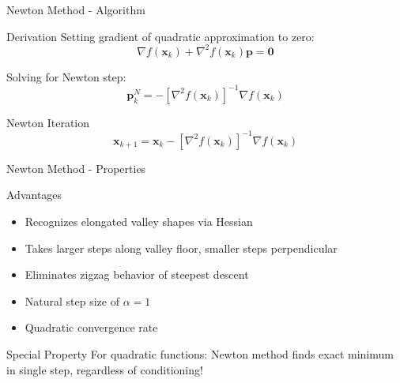 \documentclass[aspectratio=1610]{beamer}
\begin{document}
\begin{frame}{Newton Method - Algorithm}
  \begin{block}{Derivation}
    Setting gradient of quadratic approximation to zero:
    $$\nabla f(\mathbf{x}_k) + \nabla^2 f(\mathbf{x}_k)\mathbf{p} = \mathbf{0}$$
    
    Solving for Newton step:
    $$\mathbf{p}_k^N = -[\nabla^2 f(\mathbf{x}_k)]^{-1}\nabla f(\mathbf{x}_k)$$
  \end{block}
  
  \vspace{0.5cm}
  \begin{block}{Newton Iteration}
    $$\mathbf{x}_{k+1} = \mathbf{x}_k - [\nabla^2 f(\mathbf{x}_k)]^{-1}\nabla f(\mathbf{x}_k)$$
  \end{block}
\end{frame}

\begin{frame}{Newton Method - Properties}
  \begin{block}{Advantages}
    \begin{itemize}
      \item Recognizes elongated valley shapes via Hessian
      \item Takes larger steps along valley floor, smaller steps perpendicular
      \item Eliminates zigzag behavior of steepest descent
      \item Natural step size of $\alpha = 1$
      \item Quadratic convergence rate
    \end{itemize}
  \end{block}
  
  \vspace{0.5cm}
  \begin{block}{Special Property}
    For quadratic functions: Newton method finds exact minimum in single step, regardless of conditioning!
  \end{block}
\end{frame}
\end{document}
